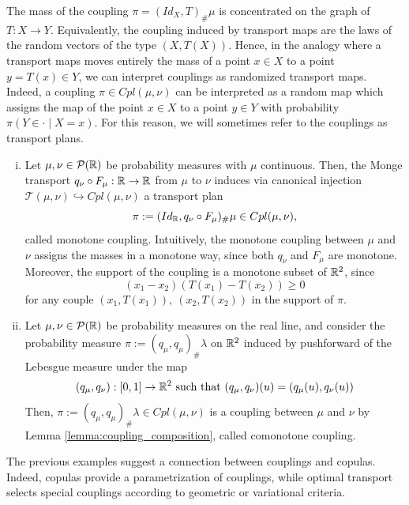 \documentclass[../main.tex]{subfiles}
\begin{document}
\begin{remark}
    The mass of the coupling $\pi=(Id_X, T)_\#\mu$ is concentrated on the graph of $T: X\to Y$. Equivalently, the coupling induced by transport maps are the laws of the random vectors of the type $(X, T(X))$. Hence, in the analogy where a transport maps moves entirely the mass of a point $x\in X$ to a point $y=T(x)\in Y$, we can interpret couplings as randomized transport maps. Indeed, a coupling $\pi\in Cpl(\mu, \nu)$ can be interpreted as a random map which assigns the map of the point $x\in X$ to a point $y\in Y$ with probability $\pi(Y\in \cdot \mid X=x)$. For this reason, we will sometimes refer to the couplings as transport plans.
\end{remark}

\begin{example} \hfill
    \begin{enumerate}[(i)]
        \item Let $\mu, \nu\in\mathcal{P}(\mathbb{R})$ be probability measures with $\mu$ continuous. Then, the Monge transport $q_\nu \circ F_\mu : \mathbb{R} \to \mathbb{R}$ from $\mu$ to $\nu$ induces via canonical injection $\mathcal{T}(\mu, \nu)\hookrightarrow Cpl(\mu, \nu)$ a transport plan 
        $$
        \pi:=(Id_{\mathbb{R}}, q_\nu\circ F_\mu)_\# \mu \in Cpl(\mu, \nu),
        $$
        called monotone coupling. Intuitively, the monotone coupling between $\mu$ and $\nu$ assigns the masses in a monotone way, since both $q_\nu$ and $F_\mu$ are monotone. Moreover, the support of the coupling is a monotone subset of $\mathbb{R}^2$, since 
        $$
        (x_1 - x_2)(T(x_1) - T(x_2)) \geq 0
        $$
        for any couple $(x_1, T(x_1)), \ (x_2, T(x_2))$ in the support of $\pi$.
        \item Let $\mu, \nu\in\mathcal{P}(\mathbb{R})$ be probability measures on the real line, and consider the probability measure $\pi:=(q_\mu, q_\mu)_\# \lambda$ on $\mathbb{R}^2$ induced by pushforward of the Lebesgue measure under the map 
        $$
        (q_\mu, q_\nu) : [0,1] \to \mathbb{R}^2 \text{ such that } (q_\mu, q_\nu)(u) = (q_\mu(u), q_\nu(u))
        $$
        Then, $\pi:=(q_\mu, q_\mu)_\# \lambda \in Cpl(\mu, \nu)$ is a coupling between $\mu$ and $\nu$ by Lemma \ref{lemma:coupling_composition}, called comonotone coupling.
    \end{enumerate}
\end{example}

\begin{remark}
    The previous examples suggest a connection between couplings and copulas. Indeed, copulas provide a parametrization of couplings, while optimal transport selects special couplings according to geometric or variational criteria.
\end{remark}
\end{document}
